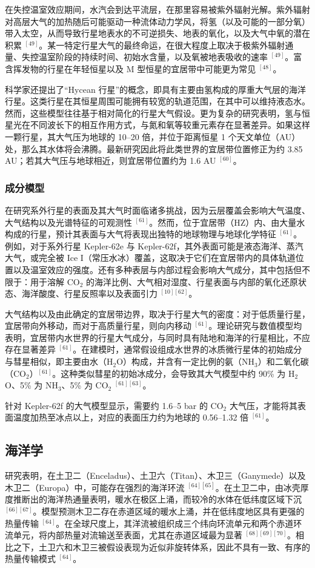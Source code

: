 在失控温室效应期间，水汽会到达平流层，在那里容易被紫外辐射光解。紫外辐射对高层大气的加热随后可能驱动一种流体动力学风，将氢（以及可能的一部分氧）带入太空，从而导致行星地表水的不可逆损失、地表的氧化，以及大气中氧的潜在积累 $^{[49]}$。某一特定行星大气的最终命运，在很大程度上取决于极紫外辐射通量、失控温室阶段的持续时间、初始水含量，以及氧被地表吸收的速率 $^{[49]}$。富含挥发物的行星在年轻恒星以及 M 型恒星的宜居带中可能更为常见 $^{[48]}$。

科学家还提出了“Hycean 行星”的概念，即具有主要由氢构成的厚重大气层的海洋行星。这类行星在其恒星周围可能拥有较宽的轨道范围，在其中可以维持液态水。然而，这些模型往往基于相对简化的行星大气假设。更为复杂的研究表明，氢与恒星光在不同波长下的相互作用方式，与氮和氧等较重元素存在显著差异。如果这样一颗行星，其大气压为地球的 10–20 倍，并位于距离恒星 1 个天文单位（AU）处，那么其水体将会沸腾。最新研究因此将此类世界的宜居带位置修正为约 3.85 AU；若其大气压与地球相近，则宜居带位置约为 1.6 AU $^{[60]}$。
\subsubsection{成分模型}
在研究系外行星的表面及其大气时面临诸多挑战，因为云层覆盖会影响大气温度、大气结构以及光谱特征的可观测性 $^{[61]}$。然而，位于宜居带（HZ）内、由大量水构成的行星，预计其表面与大气将表现出独特的地球物理与地球化学特征 $^{[61]}$。例如，对于系外行星 Kepler-62e 与 Kepler-62f，其外表面可能是液态海洋、蒸汽大气，或完全被 Ice I（常压水冰）覆盖，这取决于它们在宜居带内的具体轨道位置以及温室效应的强度。还有多种表层与内部过程会影响大气成分，其中包括但不限于：用于溶解 CO$_2$ 的海洋比例、大气相对湿度、行星表面与内部的氧化还原状态、海洋酸度、行星反照率以及表面引力 $^{[10][62]}$。

大气结构以及由此确定的宜居带边界，取决于行星大气的密度：对于低质量行星，宜居带向外移动，而对于高质量行星，则向内移动 $^{[61]}$。理论研究与数值模型均表明，宜居带内水世界的行星大气成分，与同时具有陆地和海洋的行星相比，不应存在显著差异 $^{[61]}$。在建模时，通常假设组成水世界的冰质微行星体的初始成分与彗星相似，即主要由水（H$_2$O）构成，并含有一定比例的氨（NH$_3$）和二氧化碳（CO$_2$）$^{[61]}$。这种类似彗星的初始冰成分，会导致其大气模型中约 90\% 为 H$_2$O、5\% 为 NH$_3$、5\% 为 CO$_2$ $^{[61][63]}$。

针对 Kepler-62f 的大气模型显示，需要约 1.6–5 bar 的 CO$_2$ 大气压，才能将其表面温度加热至冰点以上，对应的表面压力约为地球的 0.56–1.32 倍 $^{[61]}$。
\subsection{海洋学}
研究表明，在土卫二（Enceladus）、土卫六（Titan）、木卫三（Ganymede）以及木卫二（Europa）中，可能存在强烈的海洋环流 $^{[64][65]}$。在土卫二中，由冰壳厚度推断出的海洋热通量表明，暖水在极区上涌，而较冷的水体在低纬度区域下沉 $^{[66][67]}$。模型预测木卫二存在赤道区域的暖水上涌，并在低纬度地区具有更强的热量传输 $^{[64]}$。在全球尺度上，其洋流被组织成三个纬向环流单元和两个赤道环流单元，将内部热量对流输送至表面，尤其在赤道区域最为显著 $^{[68][69][70]}$。相比之下，土卫六和木卫三被假设表现为近似非旋转体系，因此不具有一致、有序的热量传输模式 $^{[64]}$。
